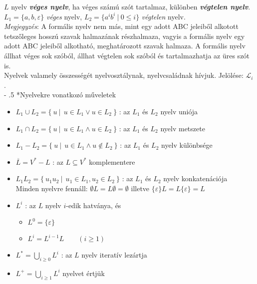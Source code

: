 \documentclass[12pt,margin=0px]{article}
\makeatletter
\renewcommand\paragraph{%
	\@startsection{paragraph}{4}{0mm}%
	{-\baselineskip}%
	{.5\baselineskip}%
	{\normalfont\normalsize\bfseries}}
\makeatother
\begin{document}
	\noindent $L$ nyelv \textbf{\emph{véges nyelv}}, ha véges számú szót tartalmaz, különben \textbf{\emph{végtelen nyelv}}.\\

    \noindent $L_1 = \Big\{a,b,\varepsilon \Big\}$ \emph{véges} nyelv, $L_2 = \Big\{a^ib^i\ \Big|\ 0 \leq i\Big\}$ \emph{végtelen} nyelv.\\

    \noindent \emph{Megjegyzés}: A  formális  nyelv  nem  más,  mint  egy  adott  ABC  jeleiből  alkotott  tetszőleges  hosszú  szavak  halmazának  részhalmaza,  vagyis  a  formális  nyelv  egy adott ABC jeleiből alkotható, meghatározott szavak halmaza. A  formális  nyelv  állhat  véges  sok  szóból,  állhat  végtelen  sok  szóból  és  tartalmazhatja az üres szót is.\\

    \noindent Nyelvek valamely összességét nyelvosztálynak, nyelvcsaládnak hívjuk. Jelölése: $\mathcal{L}_i$ .\\
							
	\paragraph*{Nyelvekre vonatkozó műveletek}

	\begin{itemize}
		\item $ L_1 \cup L_2 = \Big\{\ u\ |\ \ u \in L_1 \vee u \in L_2\ \Big\}$ : az $L_1$ és $L_2$ nyelv uniója
		\item $ L_1 \cap L_2 = \Big\{\ u\ |\ \ u \in L_1 \wedge u \in L_2\ \Big\}$ : az $L_1$ és $L_2$ nyelv metszete
		\item $ L_1 - L_2 = \Big\{\ u\ |\ \ u \in L_1 \wedge u \notin L_2\ \Big\}$ : az $L_1$ és $L_2$ nyelv különbsége
		\item $\overline{L} = V^* - L$ : az $L \subseteq V^*$ komplementere
		\item $L_1L_2 = \Big\{\ u_1u_2\ |\ \ u_1 \in L_1, u_2 \in L_2\ \Big\}$ : az $L_1$ és $L_2$ nyelv konkatenációja\\

        Minden nyelvre fennáll: $\emptyset L = L \emptyset = \emptyset$ illetve $\{\varepsilon\}L = L\{\varepsilon\} = L$
		\item $L^i$ : az $L$ nyelv $i$-edik hatványa, és
        \begin{itemize}
            \item $L^0 = \{\varepsilon\}$
            \item $L^i = L^{i-1}L \qquad (i \geq 1)$
        \end{itemize}
        \item $ L^* = \bigcup\limits_{i \geq 0} L^i$ : az $L$ nyelv iteratív lezártja
        \item $ L^+ = \bigcup\limits_{i \geq 1} L^i$ nyelvet értjük
	\end{itemize}
\end{document}
